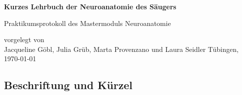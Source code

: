 \documentclass[12pt,a4paper,pdftex]{article}
\begin{document}
\setlength{\parindent}{0pt}


\begin{titlepage}
 \begin{center}
        \vspace*{1cm}
        \LARGE
        \textbf{Kurzes Lehrbuch der Neuroanatomie des Säugers}
        \vspace{2cm}
        
        \Large
        Praktikumsprotokoll des Mastermoduls Neuroanatomie
        \vspace{4cm}
        
        \large
        vorgelegt von \\ Jacqueline Göbl, Julia Grüb, Marta Provenzano und Laura Seidler %
        \vfill
        \large     
        T\"ubingen, \today
    \end{center}
    \newpage
        \thispagestyle{empty}
        \mbox{}
        \newpage
\end{titlepage}


\thispagestyle{empty}
\mbox{}


\tableofcontents
\newpage
\listoffigures

\newpage

\subsection{Beschriftung und Kürzel}
\end{document}
